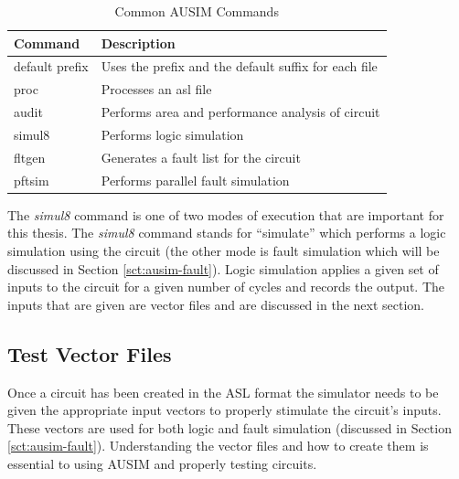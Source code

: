 \documentclass[12pt]{report}
\begin{document}
\begin{table}
	\begin{center}
		\begin{tabular}{|l|l|}
		\hline
		Command & Description \\ \hline
		default prefix & Uses the prefix and the default suffix for each file \\ \hline
		proc & Processes an asl file \\ \hline
		audit & Performs area and performance analysis of circuit \\ \hline
		simul8 & Performs logic simulation \\ \hline
		fltgen & Generates a fault list for the circuit \\ \hline
		pftsim & Performs parallel fault simulation \\ \hline
		\end{tabular}
	\end{center}
	\caption{Common AUSIM Commands\cite{ausim}}
	\label{tbl:ausim_commands}
\end{table}
The \textit{simul8} command is one of two modes of execution that are important for this thesis.  The \textit{simul8} command stands for ``simulate'' which performs a logic simulation using the circuit (the other mode is fault simulation which will be discussed in Section \ref{sct:ausim-fault}).  Logic simulation applies a given set of inputs to the circuit for a given number of cycles and records the output.  The inputs that are given are vector files and are discussed in the next section.

\subsection{Test Vector Files}
Once a circuit has been created in the ASL format the simulator needs to be given the appropriate input vectors to properly stimulate the circuit's inputs. These vectors are used for both logic and fault simulation (discussed in Section \ref{sct:ausim-fault}).  Understanding the vector files and how to create them is essential to using AUSIM and properly testing circuits.
\end{document}
